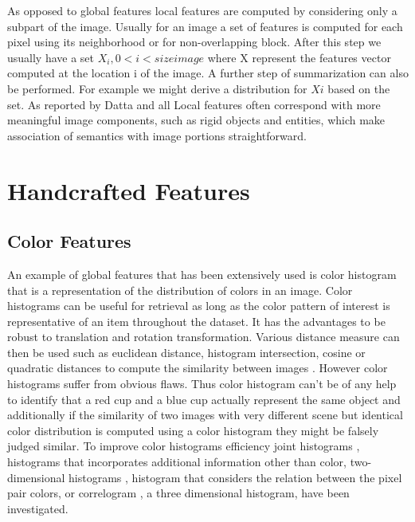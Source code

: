   As opposed to global features local features are computed by considering only a subpart of the image. Usually for an image a set of features is computed for each pixel using its neighborhood or for non-overlapping block. After this step we usually have a set \( { X_i, 0 < i < sizeimage } \) where X represent the features vector computed at the location i of the image.  A further step of summarization can also be performed. For example we might derive a distribution for \( Xi \) based on the set. As reported by Datta and all \cite{datta2008image} Local features often correspond with more meaningful image components, such as rigid objects and entities, which make association of semantics with image portions straightforward.


  \section{Handcrafted Features}

  \subsection{Color Features}

  An example of global features that has been extensively used is color histogram that is a representation of the distribution of colors in an image. Color histograms can be useful for retrieval as long as the color pattern of interest is representative of an item throughout the dataset. It has the advantages to be robust to translation and rotation transformation. Various distance measure can then be used such as euclidean distance, histogram intersection, cosine or quadratic distances to compute the similarity between images \cite{swain1991color} \cite{hafner1995efficient} \cite{stricker1995similarity}. However color histograms suffer from obvious flaws. Thus color histogram can't be of any help to identify that a red cup and a blue cup actually represent the same object and additionally if the similarity of two images with very different scene but identical color distribution is computed using a color histogram they might be falsely judged similar. To improve color histograms efficiency joint histograms \cite{pass1999comparing}, histograms that incorporates additional information other than color, two-dimensional histograms \cite{bashkov2006effectiveness}, histogram that considers the relation between the pixel pair colors, or correlogram \cite{huang1999spatial}, a three dimensional histogram, have been investigated.

